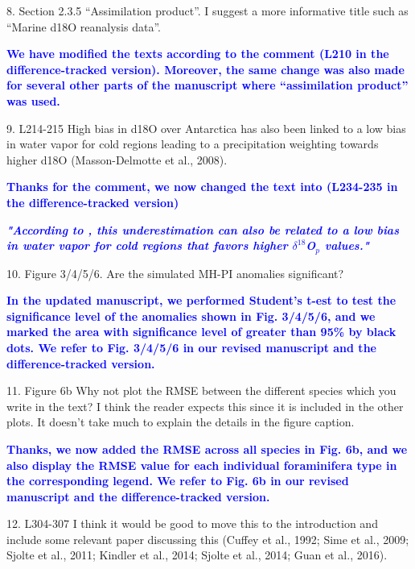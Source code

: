 \documentclass[gmd, manuscript]{copernicus}
\begin{document}
\medskip

8. Section 2.3.5 “Assimilation product”. I suggest a more informative title such as “Marine d18O reanalysis data”.

\medskip

\textcolor{blue}{\textbf{We have modified the texts according to the comment (L210 in the difference-tracked version). Moreover, the same change was also made for several other parts of the manuscript where “assimilation product” was used. }}

\medskip

9. L214-215 High bias in d18O over Antarctica has also been linked to a low bias in water vapor for cold regions leading to a precipitation weighting towards higher d18O (Masson-Delmotte et al., 2008).
\medskip

\textcolor{blue}{\textbf{Thanks for the comment, we now changed the text into (L234-235 in the difference-tracked version)}}

\textcolor{blue}{\textbf{\textit{"According to \citet{masson2008review}, this  underestimation can also be related to a low bias in water vapor for cold regions that favors higher  $\delta^{18}$O$_p$ values."}}}

\medskip


10. Figure 3/4/5/6. Are the simulated MH-PI  anomalies significant?

\medskip

\textcolor{blue}{\textbf{In the updated manuscript, we performed Student's t-est to test the significance level of the anomalies shown in Fig. 3/4/5/6, and we  marked the area with significance level of greater than 95\%  by black dots. We refer to   Fig. 3/4/5/6 in our revised manuscript and the difference-tracked version.}}

\medskip

11. Figure 6b Why not plot the RMSE between the different species which you write in the text? I think the reader expects this since it is included in the other plots. It doesn’t take much to explain the details in the figure caption.

\medskip

\textcolor{blue}{\textbf{Thanks, we now added the RMSE across all species in Fig. 6b, and we also display the RMSE value for each individual foraminifera type in the corresponding legend. We refer to  Fig. 6b in our revised manuscript  and the difference-tracked version.}}

\medskip


12. L304-307 I think it would be good to move this to the introduction and include some relevant paper discussing this (Cuffey et al., 1992; Sime et al., 2009; Sjolte et al., 2011; Kindler et al., 2014; Sjolte et al., 2014; Guan et al., 2016).
\end{document}
